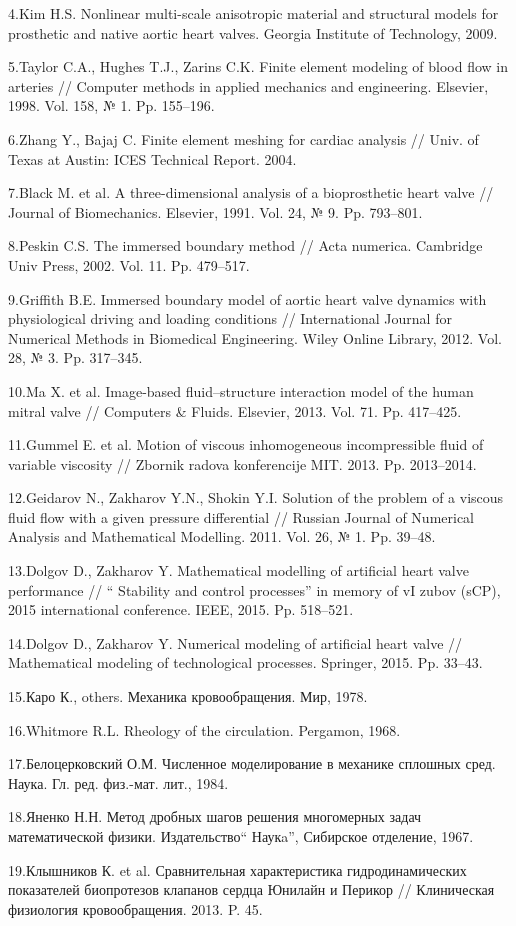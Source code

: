 4.Kim H.S. Nonlinear multi-scale anisotropic material and structural
models for prosthetic and native aortic heart valves. Georgia Institute
of Technology, 2009.

5.Taylor C.A., Hughes T.J., Zarins C.K. Finite element modeling of blood
flow in arteries // Computer methods in applied mechanics and
engineering. Elsevier, 1998. Vol. 158, № 1. Pp. 155--196.

6.Zhang Y., Bajaj C. Finite element meshing for cardiac analysis //
Univ. of Texas at Austin: ICES Technical Report. 2004.

7.Black M. et al. A three-dimensional analysis of a bioprosthetic heart
valve // Journal of Biomechanics. Elsevier, 1991. Vol. 24, № 9. Pp.
793--801.

8.Peskin C.S. The immersed boundary method // Acta numerica. Cambridge
Univ Press, 2002. Vol. 11. Pp. 479--517.

9.Griffith B.E. Immersed boundary model of aortic heart valve dynamics
with physiological driving and loading conditions // International
Journal for Numerical Methods in Biomedical Engineering. Wiley Online
Library, 2012. Vol. 28, № 3. Pp. 317--345.

10.Ma X. et al. Image-based fluid--structure interaction model of the
human mitral valve // Computers \& Fluids. Elsevier, 2013. Vol. 71. Pp.
417--425.

11.Gummel E. et al. Motion of viscous inhomogeneous incompressible fluid
of variable viscosity // Zbornik radova konferencije MIT. 2013. Pp.
2013--2014.

12.Geidarov N., Zakharov Y.N., Shokin Y.I. Solution of the problem of a
viscous fluid flow with a given pressure differential // Russian Journal
of Numerical Analysis and Mathematical Modelling. 2011. Vol. 26, № 1.
Pp. 39--48.

13.Dolgov D., Zakharov Y. Mathematical modelling of artificial heart
valve performance // `` Stability and control processes'' in memory of
vI zubov (sCP), 2015 international conference. IEEE, 2015. Pp. 518--521.

14.Dolgov D., Zakharov Y. Numerical modeling of artificial heart valve
// Mathematical modeling of technological processes. Springer, 2015. Pp.
33--43.

15.Каро К., others. Механика кровообращения. Мир, 1978.

16.Whitmore R.L. Rheology of the circulation. Pergamon, 1968.

17.Белоцерковский О.М. Численное моделирование в механике сплошных сред.
Наука. Гл. ред. физ.-мат. лит., 1984.

18.Яненко Н.Н. Метод дробных шагов решения многомерных задач
математической физики. Издательство`` Наукa'', Сибирское отделение,
1967.

19.Клышников К. et al. Сравнительная характеристика гидродинамических
показателей биопротезов клапанов сердца Юнилайн и Перикор // Клиническая
физиология кровообращения. 2013. P. 45.
